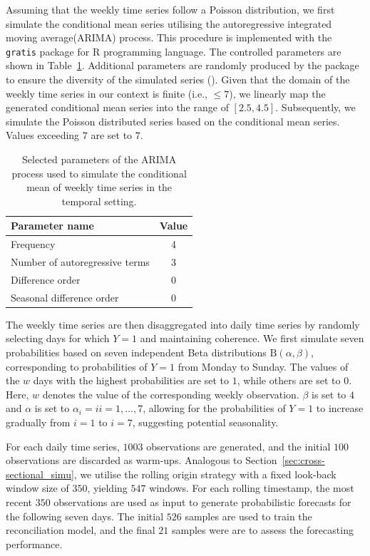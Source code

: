 \documentclass[a4paper,review,12pt,authoryear]{elsarticle}
\let\code=\texttt
\let\proglang=\textsf
\begin{document}
     Assuming that the weekly time series follow a Poisson distribution, we first simulate the conditional mean series utilising the autoregressive integrated moving average(ARIMA)  process. This procedure is implemented with the \code{gratis} package for \proglang{R} programming language. 
     The controlled parameters are shown in Table~\ref{tab:parameters}. Additional parameters are randomly produced by the package to ensure the diversity of the simulated series (). 
     Given that the domain of the weekly time series in our context is finite (i.e., $\leq 7$), we linearly map the generated conditional mean series into the range of $[2.5, 4.5]$. 
     Subsequently, we simulate the Poisson distributed series based on the conditional mean series. Values exceeding $7$ are set to $7$.
     
     \begin{table}[h]
       \centering
       \caption{\label{tab:parameters} Selected parameters of the ARIMA process used to simulate the conditional mean of weekly time series in the temporal setting.}
       \begin{tabular}{lc}
         \toprule
         Parameter name & Value \\ \midrule
         Frequency & 4 \\
         Number of autoregressive terms & 3 \\
         Difference order & 0 \\
         Seasonal difference order & 0 \\ \bottomrule
       \end{tabular}
     \end{table}
     
     The weekly time series are then disaggregated into daily time series by randomly selecting days for which $Y=1$ and maintaining coherence. 
     We first simulate seven probabilities based on seven independent Beta distributions $\textrm{B}(\alpha, \beta)$, corresponding to probabilities of $Y=1$ from Monday to Sunday. 
     The values of the $w$ days with the highest probabilities are set to $1$, while others are set to $0$. Here, $w$ denotes the value of the corresponding weekly observation.
     $\beta$ is set to $4$ and $\alpha$ is set to $\alpha_i = i i=1,\dots,7$, allowing for the probabilities of $Y=1$ to increase gradually from $i=1$ to $i=7$, suggesting potential seasonality.
     
     For each daily time series, $1003$ observations are generated, and the initial $100$ observations are discarded as warm-ups. Analogous to Section~\ref{sec:cross-sectional_simu}, we utilise the rolling origin strategy with a fixed look-back window size of $350$, yielding $547$ windows.
     For each rolling timestamp, the most recent $350$ observations are used as input to generate probabilistic forecasts for the following seven days. 
     The initial $526$ samples are used to train the reconciliation model, and the final $21$ samples were are to assess the forecasting performance.
     
\end{document}
